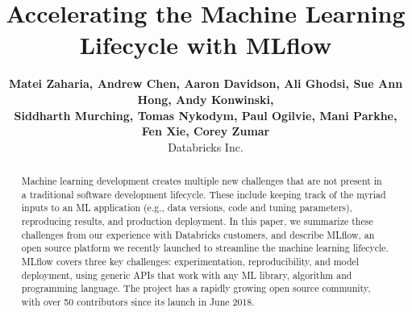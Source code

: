 \documentclass[11pt]{article}
\begin{document}
\title{Accelerating the Machine Learning Lifecycle with {MLflow}}

%

\author{
  \textbf{Matei Zaharia, Andrew Chen, Aaron Davidson, Ali Ghodsi, Sue Ann Hong, Andy Konwinski,}\\
  \textbf{Siddharth Murching, Tomas Nykodym, Paul Ogilvie, Mani Parkhe, Fen Xie, Corey Zumar} \\
  Databricks Inc.\\
}

\maketitle

\begin{abstract}
Machine learning development creates multiple new challenges that are not present in a traditional software development lifecycle.
These include keeping track of the myriad inputs to an ML application (e.g., data versions, code and tuning parameters), reproducing results, and production deployment.
In this paper, we summarize these challenges from our experience with Databricks customers, and describe MLflow, an open source platform we recently launched to streamline the machine learning lifecycle.
MLflow covers three key challenges: experimentation, reproducibility, and model deployment, using generic APIs that work with any ML library, algorithm and programming language.
The project has a rapidly growing open source community, with over 50 contributors since its launch in June 2018.
\end{abstract}
\end{document}
